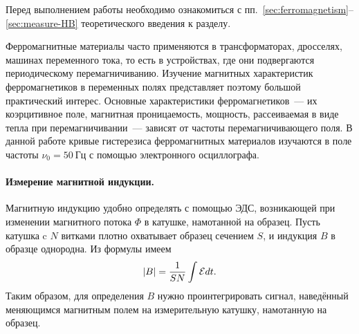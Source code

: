 


Перед выполнением работы необходимо ознакомиться с
пп.~\ref{sec:ferromagnetism}--\ref{sec:measure-HB} теоретического введения к
разделу.

Ферромагнитные материалы часто применяются в трансформаторах, дросселях, машинах
переменного тока, то есть в устройствах, где они подвергаются периодическому
перемагничиванию. Изучение магнитных характеристик ферромагнетиков в переменных
полях представляет поэтому большой практический интерес. Основные характеристики
ферромагнетиков~--- их коэрцитивное поле, магнитная проницаемость, мощность,
рассеиваемая в виде тепла при перемагничивании~--- зависят
от частоты перемагничивающего поля. В данной работе
кривые гистерезиса ферромагнитных материалов изучаются в поле частоты
$\nu_0 = 50~Гц$ с помощью электронного осциллографа.

\paragraph{Измерение магнитной индукции.}
Магнитную индукцию удобно определять с
помощью ЭДС, возникающей при изменении магнитного потока $\Phi$ в катушке,
намотанной на образец.
Пусть катушка c $N$ витками плотно охватывает образец сечением $S$, и индукция $B$ в образце однородна.
Из формулы 
имеем
%
%
\begin{equation}
	\eqmark{4.5.2}
	|B| = \frac{1}{SN}\int \mathcal{E}dt.
\end{equation}
Таким образом, для определения $B$ нужно проинтегрировать сигнал, наведённый
меняющимся магнитным полем на измерительную катушку, намотанную на образец.

